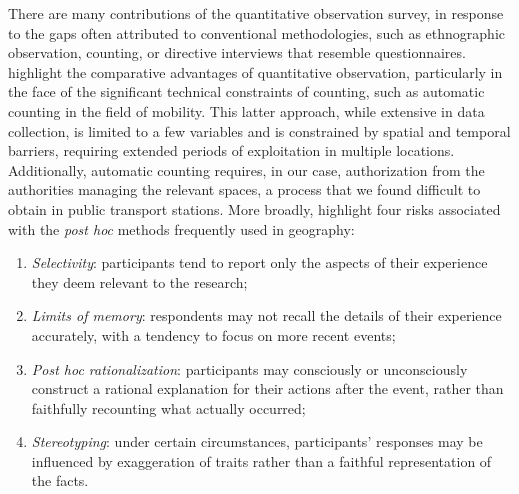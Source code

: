 \begin{refsegment}
There are many contributions of the quantitative observation survey, in response to the gaps often attributed to conventional methodologies, such as ethnographic observation, counting, or directive interviews that resemble questionnaires. \textcolor{blue}{\textcite[19]{cochoy_bicycles_2019}} highlight the comparative advantages of quantitative observation, particularly in the face of the significant technical constraints of counting, such as automatic counting in the field of mobility. This latter approach, while extensive in data collection, is limited to a few variables and is constrained by spatial and temporal barriers, requiring extended periods of exploitation in multiple locations. Additionally, automatic counting requires, in our case, authorization from the authorities managing the relevant spaces, a process that we found difficult to obtain in public transport stations. More broadly, \textcolor{blue}{\textcite[465]{cotton_using_2010}} highlight four risks associated with the \textsl{post hoc} methods frequently used in geography:
\begin{enumerate}
    \item \textsl{Selectivity}: participants tend to report only the aspects of their experience they deem relevant to the research;
    \item \textsl{Limits of memory}: respondents may not recall the details of their experience accurately, with a tendency to focus on more recent events;
    \item \textsl{Post hoc rationalization}: participants may consciously or unconsciously construct a rational explanation for their actions after the event, rather than faithfully recounting what actually occurred;
    \item \textsl{Stereotyping}: under certain circumstances, participants' responses may be influenced by exaggeration of traits rather than a faithful representation of the facts.
\end{enumerate}%


\end{refsegment}
